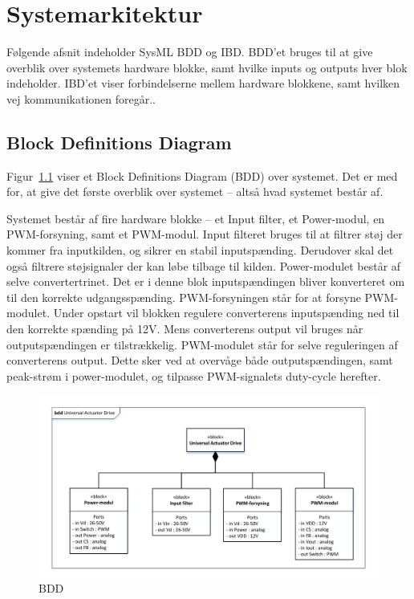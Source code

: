 \chapter{Systemarkitektur}

 
Følgende afsnit indeholder SysML BDD og IBD. BDD'et bruges til at give overblik over  systemets hardware blokke, samt hvilke inputs og outputs hver blok indeholder. IBD'et viser forbindelserne mellem hardware blokkene, samt hvilken vej kommunikationen foregår..


\section{Block Definitions Diagram}
\noindent Figur~\ref{fig: BDD} viser et Block Definitions Diagram (BDD) over systemet. Det er med for, at give det første overblik over systemet -- altså hvad systemet består af.

Systemet består af fire hardware blokke -- et Input filter, et Power-modul, en PWM-forsyning, samt et PWM-modul.
Input filteret bruges til at filtrer støj der kommer fra inputkilden, og sikrer en stabil inputspænding. Derudover skal det også filtrere støjsignaler der kan løbe tilbage til kilden.
Power-modulet består af selve convertertrinet. Det er i denne blok inputspændingen bliver konverteret om til den korrekte udgangsspænding.
PWM-forsyningen står for at forsyne PWM-modulet. Under opstart vil blokken regulere converterens inputspænding ned til den korrekte spænding på 12V. Mens converterens output vil bruges når outputspændingen er tilstrækkelig.
PWM-modulet står for selve reguleringen af converterens output. Dette sker ved at overvåge både outputspændingen, samt peak-strøm i power-modulet, og tilpasse PWM-signalets duty-cycle herefter.   

\begin{figure}[H]
	\centering
	\includegraphics[width=1.00\textwidth]{tex/systemarkitektur/billeder/BDD.pdf}
	\caption{BDD}
	\label{fig: BDD}
\end{figure}

